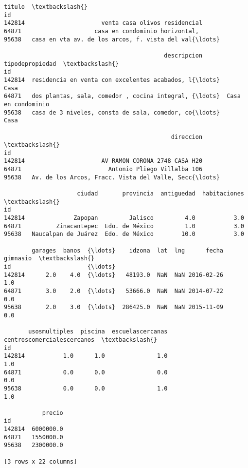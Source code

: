 \documentclass[11pt]{article}
\newcommand{\prompt}[4]{
        \llap{{\color{#2}[#3]: #4}}\vspace{-1.25em}
    }
\begin{document}
            \begin{tcolorbox}[breakable, boxrule=.5pt, size=fbox, pad at break*=1mm, opacityfill=0]
\prompt{Out}{outcolor}{4}{\hspace{3.5pt}}
\begin{Verbatim}[commandchars=\\\{\}]
                                                   titulo  \textbackslash{}
id
142814                      venta casa olivos residencial
64871                     casa en condominio horizontal,
95638   casa en vta av. de los arcos, f. vista del val{\ldots}

                                              descripcion     tipodepropiedad  \textbackslash{}
id
142814  residencia en venta con excelentes acabados, l{\ldots}                Casa
64871   dos plantas, sala, comedor , cocina integral, {\ldots}  Casa en condominio
95638   casa de 3 niveles, consta de sala, comedor, co{\ldots}                Casa

                                                direccion  \textbackslash{}
id
142814                      AV RAMON CORONA 2748 CASA H20
64871                         Antonio Pliego Villalba 106
95638   Av. de los Arcos, Fracc. Vista del Valle, Secc{\ldots}

                     ciudad       provincia  antiguedad  habitaciones  \textbackslash{}
id
142814              Zapopan         Jalisco         4.0           3.0
64871          Zinacantepec  Edo. de México         1.0           3.0
95638   Naucalpan de Juárez  Edo. de México        10.0           3.0

        garages  banos  {\ldots}    idzona  lat  lng      fecha  gimnasio  \textbackslash{}
id                      {\ldots}
142814      2.0    4.0  {\ldots}   48193.0  NaN  NaN 2016-02-26       1.0
64871       3.0    2.0  {\ldots}   53666.0  NaN  NaN 2014-07-22       0.0
95638       2.0    3.0  {\ldots}  286425.0  NaN  NaN 2015-11-09       0.0

       usosmultiples  piscina  escuelascercanas  centroscomercialescercanos  \textbackslash{}
id
142814           1.0      1.0               1.0                         1.0
64871            0.0      0.0               0.0                         0.0
95638            0.0      0.0               1.0                         1.0

           precio
id
142814  6000000.0
64871   1550000.0
95638   2300000.0

[3 rows x 22 columns]
\end{Verbatim}
\end{tcolorbox}
        
\end{document}
